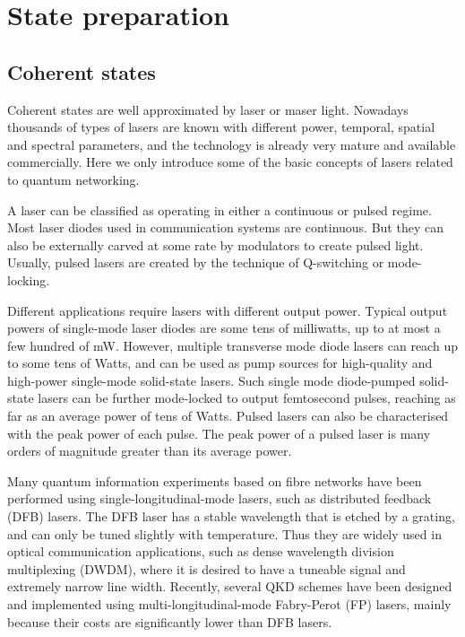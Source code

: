 %
%

\section{State preparation} 

%
%

\subsection{Coherent states} 


Coherent states are well approximated by laser or maser light. Nowadays thousands of types of lasers are known with different power, temporal, spatial and spectral parameters, and the technology is already very mature and available commercially. Here we only introduce some of the basic concepts of lasers related to quantum networking.

A laser can be classified as operating in either a continuous or pulsed regime. Most laser diodes used in communication systems are continuous. But they can also be externally carved at some rate by modulators to create pulsed light. Usually, pulsed lasers are created by the technique of Q-switching or mode-locking.

Different applications require lasers with different output power. Typical output powers of single-mode laser diodes are some tens of milliwatts, up to at most a few hundred of mW. However, multiple transverse mode diode lasers can reach up to some tens of Watts, and can be used as pump sources for high-quality and high-power single-mode solid-state lasers. Such single mode diode-pumped solid-state lasers can be further mode-locked to output femtosecond pulses, reaching as far as an average power of tens of Watts. Pulsed lasers can also be characterised with the peak power of each pulse. The peak power of a pulsed laser is many orders of magnitude greater than its average power.

Many quantum information experiments based on fibre networks \cite{bib:sun2016quantum} have been performed using single-longitudinal-mode lasers, such as distributed feedback (DFB) lasers. The DFB laser has a stable wavelength that is etched by a grating, and can only be tuned slightly with temperature. Thus they are widely used in optical communication applications, such as dense wavelength division multiplexing (DWDM), where it is desired to have a tuneable signal and extremely narrow line width. Recently, several QKD schemes \cite{bib:choi2011quantum, bib:wang2015experimental} have been designed and implemented using multi-longitudinal-mode Fabry-Perot (FP) lasers, mainly because their costs are significantly lower than DFB lasers.


